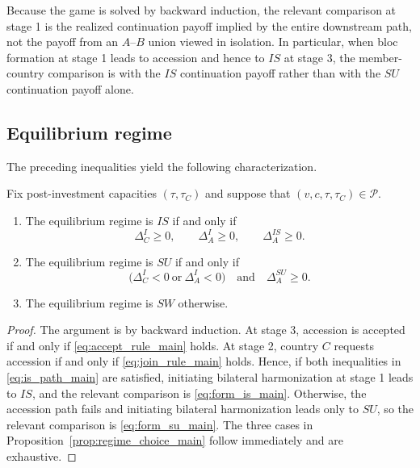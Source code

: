 Because the game is solved by backward induction, the relevant comparison at
stage 1 is the realized continuation payoff implied by the entire downstream
path, not the payoff from an $A$--$B$ union viewed in isolation. In
particular, when bloc formation at stage 1 leads to accession and hence to $IS$
at stage 3, the member-country comparison is with the $IS$ continuation payoff
rather than with the $SU$ continuation payoff alone.

\subsection{Equilibrium regime}

The preceding inequalities yield the following characterization.

\begin{proposition}
Fix post-investment capacities $(\tau,\tau_C)$ and suppose that $(v,c,\tau,\tau_C)\in\mathcal P$.

\begin{enumerate}
    \item The equilibrium regime is $IS$ if and only if
    \[
    \Delta_C^I \ge 0,\qquad
    \Delta_A^I \ge 0,\qquad
    \Delta_A^{IS} \ge 0.
    \]

    \item The equilibrium regime is $SU$ if and only if
    \[
    \bigl(\Delta_C^I<0 \ \text{or}\ \Delta_A^I<0\bigr)
    \quad\text{and}\quad
    \Delta_A^{SU}\ge 0.
    \]

    \item The equilibrium regime is $SW$ otherwise.
\end{enumerate}
\label{prop:regime_choice_main}
\end{proposition}

\begin{proof}
The argument is by backward induction. At stage 3, accession is accepted if and only if \eqref{eq:accept_rule_main} holds. At stage 2, country $C$ requests accession if and only if \eqref{eq:join_rule_main} holds. Hence, if both inequalities in \eqref{eq:is_path_main} are satisfied, initiating bilateral harmonization at stage 1 leads to $IS$, and the relevant comparison is \eqref{eq:form_is_main}. Otherwise, the accession path fails and initiating bilateral harmonization leads only to $SU$, so the relevant comparison is \eqref{eq:form_su_main}. The three cases in Proposition~\ref{prop:regime_choice_main} follow immediately and are exhaustive.
\end{proof}

